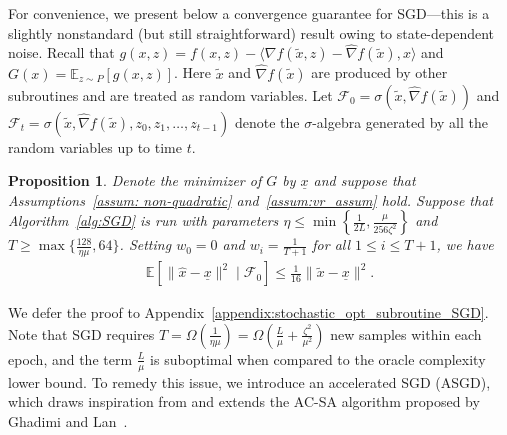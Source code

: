 \documentclass[11pt,twoside]{article}
\numberwithin{equation}{section}
\newcommand{\EE}{\mathbb{E}}
\newcommand{\1}{\mathbf{1}}
\newtheorem{proposition}[theorem]{Proposition}
\newcommand{\cF}{\mathcal{F}}
\theoremstyle{remark}
\theoremstyle{plain}
\begin{document}
For convenience, we present below a convergence guarantee for SGD---this is a slightly nonstandard (but still straightforward) result owing to state-dependent noise. Recall that $g(x,z)= f(x,z) - \langle \nabla f(\tilde x, z) - \widehat \nabla f(\tilde x), x \rangle$ and $G(x) = \EE_{z\sim P}[g(x,z)]$. Here $\tilde x$ and $\widehat \nabla f(\tilde x)$ are produced by other subroutines and are treated as random variables. Let $\cF_0 = \sigma\left(\tilde x, \widehat \nabla f(\tilde x) \right) $ and $\cF_t = \sigma\left(\tilde x, \widehat \nabla f(\tilde x), z_0, z_1,\ldots,z_{t-1}\right)$ denote the $\sigma$-algebra generated by all the random variables up to time $t$.
\begin{proposition}\label{prop:convergence_SGD}
Denote the minimizer of $G$ by $\underline{x}$ and suppose that Assumptions~\ref{assum: non-quadratic} and~\ref{assum:vr_assum} hold. Suppose that Algorithm~\ref{alg:SGD} is run with parameters $\eta \le \min \left\{\frac{1}{2L}, \frac{\mu }{256\zeta^2} \right\}$ and $T \ge \max\{\frac{128}{\eta \mu}, 64\}$. Setting  $w_0 = 0$ and $w_i = \frac{1}{T+1}$ for all $1\le i \le T+1$,  we have
\begin{align*}
	\EE[\|\widehat x - \underline{x}\|^2 \mid \cF_0] \le \frac{1}{16} \|\tilde x - \underline{x}\|^2.
\end{align*}
\end{proposition}
We defer the proof to Appendix~\ref{appendix:stochastic_opt_subroutine_SGD}. Note that SGD requires $T = \Omega(\frac{1}{\eta \mu}) = \Omega( \frac{L}{\mu} + \frac{\zeta^2}{\mu^2})$ new samples within each epoch, and the term $\frac{L}{\mu}$ is suboptimal when compared to the oracle complexity lower bound. To remedy this issue, we introduce an accelerated SGD (ASGD), which draws inspiration from and extends the AC-SA algorithm proposed by Ghadimi and Lan~\cite{ghadimi2012optimal}. 
\end{document}
